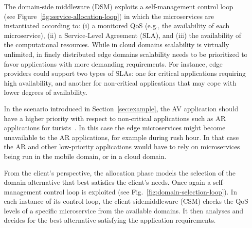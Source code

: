 

The domain-side middleware (DSM) exploits a self-management control loop~\cite{kephart2003vision} (see Figure~\ref{fig:service-allocation-loop}) in which the microservices are instantiated according to: (i) a monitored QoS (e.g., the availability of each microservice), (ii) a Service-Level Agreement (SLA), and (iii) the availability of the computational resources. 
While in cloud domains scalability is virtually unlimited, in finely distributed edge domains scalability needs to be prioritized to favor applications with more demanding requirements. For instance, edge providers could support two types of SLAs: one for critical applications requiring high availability, and another for non-critical applications that may cope with lower degrees of availability.  

In the scenario introduced in Section~\ref{sec:example}, the AV application should have a higher priority with respect to non-critical applications such as AR applications for turists~\cite{GarrigaMendonca2017}. In this case the edge microservices might become unavailable to the AR applications, for example during rush hour. In that case the AR and other low-priority applications would have to rely on microservices being run in the mobile domain, or in a cloud domain.


From the client's perspective, the allocation phase models the selection of the domain alternative that best satisfies the client's needs. Once again a self-management control loop is exploited (see Fig.~\ref{fig:domain-selection-loop}). In each instance of its control loop, the client-sidemiddleware (CSM) checks the QoS levels of a specific microservice from the available domains. It then analyses and decides for the best alternative satisfying the application requirements.

